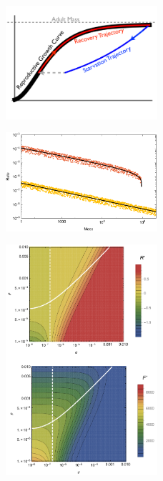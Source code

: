 \documentclass{pnastwo}
\begin{document}
\begin{figure}
\centering
\includegraphics[width=0.5\textwidth]{Growth-trajectory-diagram.pdf}
\caption{ %
}
\label{fig:growth}
\end{figure}

\begin{figure}
\centering
\includegraphics[width=0.5\textwidth]{fig_GvS.pdf}
\caption{ %
}
\label{fig:gvs}
\end{figure}

\begin{figure}
\centering
\includegraphics[width=0.5\textwidth]{fig_FixedPoint.pdf}
\caption{ %
}
\label{fig:fp}
\end{figure}
\end{document}
